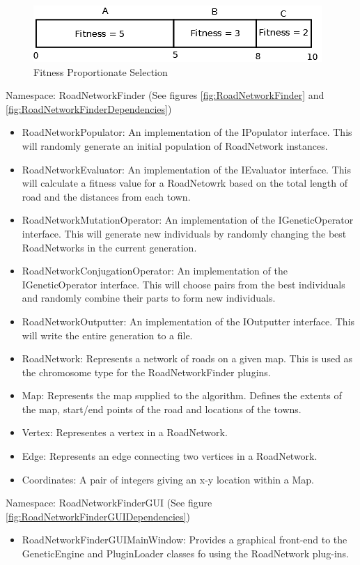 \begin{figure}[ht!]
 \caption{Fitness Proportionate Selection}\label{fig:FitnessProportionateSelection}
 \centering
 \includegraphics[scale=0.5]{../Stochastic.png}
\end{figure}

Namespace: RoadNetworkFinder (See figures \ref{fig:RoadNetworkFinder} and \ref{fig:RoadNetworkFinderDependencies})
\begin{itemize}
\item RoadNetworkPopulator: An implementation of the IPopulator interface. This will randomly generate an initial population of RoadNetwork instances.
\item RoadNetworkEvaluator: An implementation of the IEvaluator interface. This will calculate a fitness value for a RoadNetowrk based on the total length of road and the distances from each town.
\item RoadNetworkMutationOperator: An implementation of the IGeneticOperator interface. This will generate new individuals by randomly changing the best RoadNetworks in the current generation.
\item RoadNetworkConjugationOperator: An implementation of the IGeneticOperator interface. This will choose pairs from the best individuals and randomly combine their parts to form new individuals.
\item RoadNetworkOutputter: An implementation of the IOutputter interface. This will write the entire generation to a file.
\item RoadNetwork: Represents a network of roads on a given map. This is used as the chromosome type for the RoadNetworkFinder plugins.
\item Map: Represents the map supplied to the algorithm. Defines the extents of the map, start/end points of the road and locations of the towns.
\item Vertex: Representes a vertex in a RoadNetwork.
\item Edge: Represents an edge connecting two vertices in a RoadNetwork.
\item Coordinates: A pair of integers giving an x-y location within a Map.
\end{itemize}

Namespace: RoadNetworkFinderGUI (See figure \ref{fig:RoadNetworkFinderGUIDependencies})
\begin{itemize}
\item RoadNetworkFinderGUIMainWindow: Provides a graphical front-end to the GeneticEngine and PluginLoader classes fo using the RoadNetwork plug-ins.
\end{itemize}

